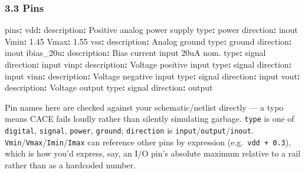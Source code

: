 \documentclass[
]{article}
\newenvironment{Shaded}{}{}
\newcommand{\AttributeTok}[1]{\textcolor[rgb]{0.49,0.56,0.16}{#1}}
\newcommand{\FloatTok}[1]{\textcolor[rgb]{0.25,0.63,0.44}{#1}}
\newcommand{\FunctionTok}[1]{\textcolor[rgb]{0.02,0.16,0.49}{#1}}
\newcommand{\KeywordTok}[1]{\textcolor[rgb]{0.00,0.44,0.13}{\textbf{#1}}}
\begin{document}
\hypertarget{pins}{%
\subsubsection{3.3 Pins}\label{pins}}

\begin{Shaded}
\begin{Highlighting}[]
\FunctionTok{pins}\KeywordTok{:}
\AttributeTok{  }\FunctionTok{vdd}\KeywordTok{:}
\AttributeTok{    }\FunctionTok{description}\KeywordTok{:}\AttributeTok{ Positive analog power supply}
\AttributeTok{    }\FunctionTok{type}\KeywordTok{:}\AttributeTok{ power}
\AttributeTok{    }\FunctionTok{direction}\KeywordTok{:}\AttributeTok{ inout}
\AttributeTok{    }\FunctionTok{Vmin}\KeywordTok{:}\AttributeTok{ }\FloatTok{1.45}
\AttributeTok{    }\FunctionTok{Vmax}\KeywordTok{:}\AttributeTok{ }\FloatTok{1.55}
\AttributeTok{  }\FunctionTok{vss}\KeywordTok{:}
\AttributeTok{    }\FunctionTok{description}\KeywordTok{:}\AttributeTok{ Analog ground}
\AttributeTok{    }\FunctionTok{type}\KeywordTok{:}\AttributeTok{ ground}
\AttributeTok{    }\FunctionTok{direction}\KeywordTok{:}\AttributeTok{ inout}
\AttributeTok{  }\FunctionTok{ibias\_20u}\KeywordTok{:}
\AttributeTok{    }\FunctionTok{description}\KeywordTok{:}\AttributeTok{ Bias current input 20uA nom.}
\AttributeTok{    }\FunctionTok{type}\KeywordTok{:}\AttributeTok{ signal}
\AttributeTok{    }\FunctionTok{direction}\KeywordTok{:}\AttributeTok{ input}
\AttributeTok{  }\FunctionTok{vinp}\KeywordTok{:}
\AttributeTok{    }\FunctionTok{description}\KeywordTok{:}\AttributeTok{ Voltage positive input}
\AttributeTok{    }\FunctionTok{type}\KeywordTok{:}\AttributeTok{ signal}
\AttributeTok{    }\FunctionTok{direction}\KeywordTok{:}\AttributeTok{ input}
\AttributeTok{  }\FunctionTok{vinn}\KeywordTok{:}
\AttributeTok{    }\FunctionTok{description}\KeywordTok{:}\AttributeTok{ Voltage negative input}
\AttributeTok{    }\FunctionTok{type}\KeywordTok{:}\AttributeTok{ signal}
\AttributeTok{    }\FunctionTok{direction}\KeywordTok{:}\AttributeTok{ input}
\AttributeTok{  }\FunctionTok{vout}\KeywordTok{:}
\AttributeTok{    }\FunctionTok{description}\KeywordTok{:}\AttributeTok{ Voltage output}
\AttributeTok{    }\FunctionTok{type}\KeywordTok{:}\AttributeTok{ signal}
\AttributeTok{    }\FunctionTok{direction}\KeywordTok{:}\AttributeTok{ output}
\end{Highlighting}
\end{Shaded}

Pin names here are checked against your schematic/netlist directly --- a
typo means CACE fails loudly rather than silently simulating garbage.
\texttt{type} is one of \texttt{digital}, \texttt{signal},
\texttt{power}, \texttt{ground}; \texttt{direction} is
\texttt{input}/\texttt{output}/\texttt{inout}.
\texttt{Vmin}/\texttt{Vmax}/\texttt{Imin}/\texttt{Imax} can reference
other pins by expression (e.g.~\texttt{vdd\ +\ 0.3}), which is how you'd
express, say, an I/O pin's absolute maximum relative to a rail rather
than as a hardcoded number.
\end{document}
